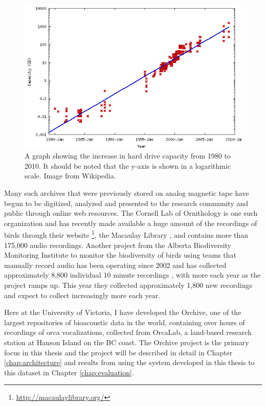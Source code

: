 \begin{figure}[t]
\centering
\includegraphics[width=\columnwidth]{figures/hardDriveCapacityOverTime.png}
\caption{A graph showing the increase in hard drive capacity from 1980
  to 2010.  It should be noted that the y-axis is shown in a
  logarithmic scale.  Image from Wikipedia.}
\label{fig:hardDriveCapacityOverTime}
\end{figure}

Many such archives that were previously stored on analog magnetic tape
have begun to be digitized, analyzed and presented to the research
community and public through online web resources.  The Cornell Lab of
Ornithology is one such organization and has recently made available a
huge amount of the recordings of birds through their
website \footnote{\url{http://macaulaylibrary.org/}}, the Macaulay
Library \cite{macaulay2007library}, and contains more than 175,000
audio recordings.  Another project from the Alberta Biodiversity
Monitoring Institute to monitor the biodiversity of birds using teams
that manually record audio has been operating since 2002 and has
collected approximately 8,800 individual 10 minute recordings
\cite{boutin2009abmi}, with more each year as the project ramps up.
This year they collected approximately 1,800 new recordings and expect
to collect increasingly more each year.

Here at the University of Victoria, I have developed the Orchive, one
of the largest repositories of bioacoustic data in the world,
containing over \aboutNumberOfOrchiveRecordings hours of recordings of
orca vocalizations, collected from OrcaLab, a land-based research
station at Hanson Island on the BC coast.  The Orchive project is the
primary focus in this thesis and the project will be described in
detail in Chapter \ref{chap:architecture} and results from using the
system developed in this thesis to this dataset in Chapter
\ref{chap:evaluation}.

